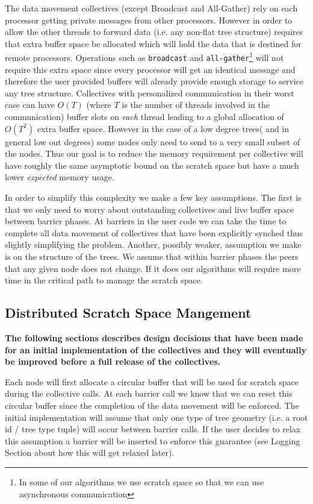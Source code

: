 \documentclass[times,10pt]{article}
\begin{document}
The data movement collectives (except Broadcast and All-Gather) rely on each processor getting private messages from other processors. However in order to allow the other threads to forward data (i.e. any non-flat tree structure) requires that extra buffer space be allocated which will hold the data that is destined for remote processors. Operations such as \texttt{broadcast} and \texttt{all-gather}\footnote{In some of our algorithms we use scratch space so that we can use asynchronous communication} will not require this extra space since every processor will get an identical message and therefore the user provided buffers will already provide enough storage to service any tree structure. Collectives with personalized communication in their worst case can have $O(T)$ (where $T$ is the number of threads involved in the communication) buffer slots on \textit{each} thread leading to a global allocation of $O(T^2)$ extra buffer space. However in the case of a low degree trees( and in general low out degrees) some nodes only need to send to a very small subset of the nodes. Thus our goal is to reduce the memory requirement per collective will have roughly the same asymptotic bound on the scratch space but have a much lower \textit{expected} memory usage. 

In order to simplify this complexity we make a few key assumptions. The first is that we only need to worry about outstanding collectives and live buffer space between barrier phases. At barriers in the user code we can take the time to complete all data movement of collectives that have been explicitly synched thus slightly simplifying the problem. Another, possibly weaker, assumption we make is on the structure of the trees. We assume that within barrier phases the peers that any given node does not change. If it does our algorithms will require more time in the critical path to manage the scratch space.  

\subsection{Distributed Scratch Space Mangement}
\textbf{The following sections describes design decisions that have been made for an initial implementation of the collectives and they will eventually be improved before a full release of the collectives.}

Each node will first allocate a circular buffer that will be used for scratch space during the collective calls. At each barrier call we know that we can reset this circular buffer since the completion of the data movement will be enforced. The initial implementation will assume that only one type of tree geometry (i.e. a root id / tree type tuple) will occur between barrier calls. If the user decides to relax this assumption a barrier will be inserted to enforce this guarantee (see Logging Section about how this will get relaxed later). 
\end{document}
